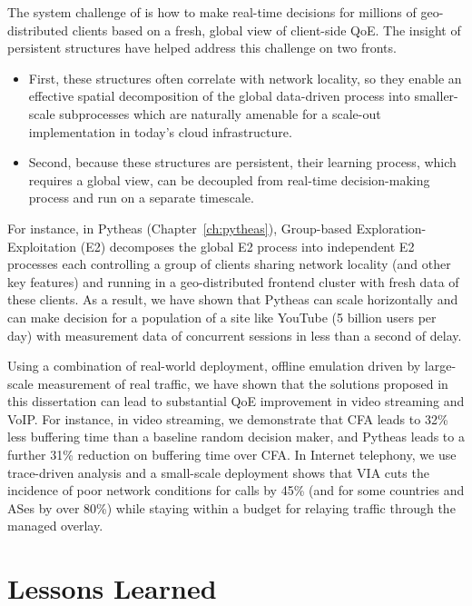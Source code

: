 The system challenge of \ddn is how to make real-time decisions
for millions of geo-distributed clients based on a fresh, global
view of client-side QoE.
The insight of persistent structures have helped address
this challenge on two fronts.
\begin{itemize}
\item First,  these structures often correlate with network locality,
so they enable an effective spatial decomposition of the global 
data-driven process
into smaller-scale subprocesses which are naturally amenable for 
a scale-out implementation in today's cloud infrastructure.
\item Second, because these structures are persistent, their 
learning process, which requires a global view, can be decoupled
from real-time decision-making process and run on a separate
timescale.
\end{itemize}
For instance, in Pytheas (Chapter~\ref{ch:pytheas}), Group-based 
Exploration-Exploitation (E2) decomposes the global E2 process
into independent E2 processes each controlling a group of 
clients sharing network locality (and other key features)
and running in a geo-distributed frontend
cluster with fresh data of these clients.
As a result, we have shown that Pytheas can scale horizontally 
and can make decision for a population of a site like YouTube (5
billion users per day) with measurement data of 
concurrent sessions in less than a second of delay.


Using a combination of real-world deployment, offline emulation
driven by large-scale measurement of real traffic, we have shown
that the solutions proposed in this dissertation can lead to substantial 
QoE improvement in video streaming and VoIP. 
For instance, in video streaming, we demonstrate that CFA leads to  
32\% less buffering time than a baseline random decision maker,
and Pytheas leads to a further 31\% reduction on buffering time
over CFA.
In Internet telephony, we use trace-driven analysis
and a small-scale deployment shows that VIA cuts the incidence
of poor network conditions for calls by 45\% (and for
some countries and ASes by over 80\%) while staying within
a budget for relaying traffic through the managed overlay.



\section{Lessons Learned}
\label{sec:concl:lessions}

